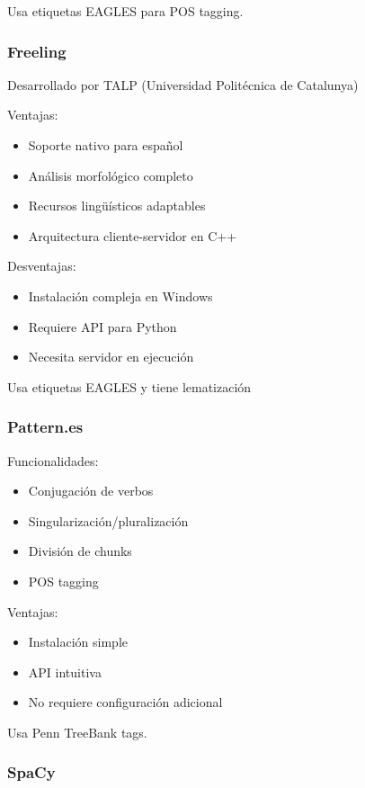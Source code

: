 \documentclass{report}
\begin{document}
Usa etiquetas EAGLES para POS tagging.

\subsubsection{Freeling}
Desarrollado por TALP (Universidad Politécnica de Catalunya)

Ventajas:

\begin{itemize}
    \item Soporte nativo para español
    \item Análisis morfológico completo
    \item Recursos lingüísticos adaptables
    \item Arquitectura cliente-servidor en C++
\end{itemize}

Desventajas:

\begin{itemize}
    \item Instalación compleja en Windows
    \item Requiere API para Python
    \item Necesita servidor en ejecución
\end{itemize}

Usa etiquetas EAGLES y tiene lematización

\subsubsection{Pattern.es}
Funcionalidades:
\begin{itemize}
    \item Conjugación de verbos
    \item Singularización/pluralización
    \item División de chunks
    \item POS tagging
\end{itemize}

Ventajas:
\begin{itemize}
    \item Instalación simple
    \item API intuitiva
    \item No requiere configuración adicional
\end{itemize}

Usa Penn TreeBank tags.

\subsubsection{SpaCy}
\end{document}
